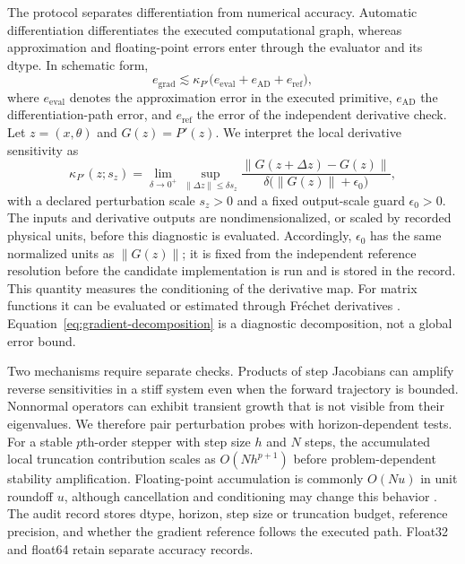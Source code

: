 \documentclass[preprint,12pt,authoryear]{elsarticle}
\begin{document}
The protocol separates differentiation from numerical accuracy. Automatic differentiation differentiates the executed computational graph, whereas approximation and floating-point errors enter through the evaluator and its dtype. In schematic form,
\begin{equation}
 e_{\mathrm{grad}} \lesssim
 \kappa_{P'}\bigl(e_{\mathrm{eval}}+e_{\mathrm{AD}}+e_{\mathrm{ref}}\bigr),
 \label{eq:gradient-decomposition}
\end{equation}
where $e_{\mathrm{eval}}$ denotes the approximation error in the executed primitive, $e_{\mathrm{AD}}$ the differentiation-path error, and $e_{\mathrm{ref}}$ the error of the independent derivative check. Let $z=(x,\theta)$ and $G(z)=P'(z)$. We interpret the local derivative sensitivity as
\begin{equation}
 \kappa_{P'}(z;s_z)=\lim_{\delta\to0^+}\sup_{\|\Delta z\|\leq\delta s_z}
 \frac{\|G(z+\Delta z)-G(z)\|}{\delta\bigl(\|G(z)\|+\epsilon_0\bigr)},
 \label{eq:derivative-condition}
\end{equation}
with a declared perturbation scale $s_z>0$ and a fixed output-scale guard $\epsilon_0>0$. The inputs and derivative outputs are nondimensionalized, or scaled by recorded physical units, before this diagnostic is evaluated. Accordingly, $\epsilon_0$ has the same normalized units as $\|G(z)\|$; it is fixed from the independent reference resolution before the candidate implementation is run and is stored in the record. This quantity measures the conditioning of the derivative map. For matrix functions it can be evaluated or estimated through Fr\'echet derivatives \citep{higham2008functions,higham2014frechet}. Equation~\eqref{eq:gradient-decomposition} is a diagnostic decomposition, not a global error bound.

Two mechanisms require separate checks. Products of step Jacobians can amplify reverse sensitivities in a stiff system even when the forward trajectory is bounded. Nonnormal operators can exhibit transient growth that is not visible from their eigenvalues. We therefore pair perturbation probes with horizon-dependent tests. For a stable $p$th-order stepper with step size $h$ and $N$ steps, the accumulated local truncation contribution scales as $O(Nh^{p+1})$ before problem-dependent stability amplification. Floating-point accumulation is commonly $O(Nu)$ in unit roundoff $u$, although cancellation and conditioning may change this behavior \citep{higham2002accuracy}. The audit record stores dtype, horizon, step size or truncation budget, reference precision, and whether the gradient reference follows the executed path. Float32 and float64 retain separate accuracy records.
\end{document}
